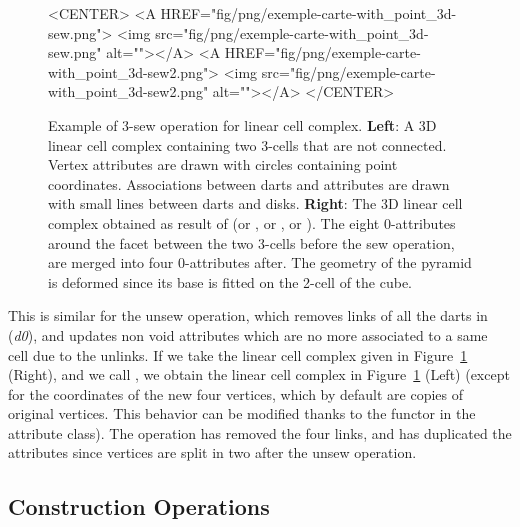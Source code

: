 \begin{figure}
\begin{ccTexOnly}
\begin{center}
    \end{center}
  \end{ccTexOnly}
  \begin{ccHtmlOnly}
    <CENTER>
    <A HREF="fig/png/exemple-carte-with_point_3d-sew.png">
        <img src="fig/png/exemple-carte-with_point_3d-sew.png" alt=""></A>
    <A HREF="fig/png/exemple-carte-with_point_3d-sew2.png">
        <img src="fig/png/exemple-carte-with_point_3d-sew2.png" alt=""></A>
    </CENTER>
    \end{ccHtmlOnly}
    \caption{Example of 3-sew operation for linear cell complex.
      \textbf{Left}: A 3D linear cell complex containing two 3-cells
      that are not connected. Vertex attributes are drawn with circles
      containing point coordinates.  Associations between darts and
      attributes are drawn with small lines between darts and
      disks. \textbf{Right}: The 3D linear cell complex obtained as
      result of  (or , or
      , or ).  The eight
      0-attributes around the facet between the two 3-cells before the
      sew operation, are merged into four 0-attributes after. The
      geometry of the pyramid is deformed since its base is fitted on
      the 2-cell of the cube.}
    \label{fig-lcc-exemple-sew}
\end{figure} 

This is similar for the unsew operation, which removes \betai{} links
of all the darts in
\orbit{\betaun{},\myldots{},\betaimdeux{},\betaipdeux{},\myldots{},\betad{}}(\emph{d0}), 
and updates
non void attributes which are no more associated to a same cell due to
the unlinks.  If we take the linear cell complex given in
Figure~\ref{fig-lcc-exemple-sew} (Right), and we call
, we obtain the linear cell complex in
Figure~\ref{fig-lcc-exemple-sew} (Left) (except for the coordinates of
the new four vertices, which by default are copies of original
vertices. This behavior can be modified thanks to the functor
 in the attribute class).  The  operation
has removed the four \betatrois{} links, and has duplicated the attributes
since vertices are split in two after the unsew operation.

\subsection{Construction Operations}\label{ssec-constructions-op}

